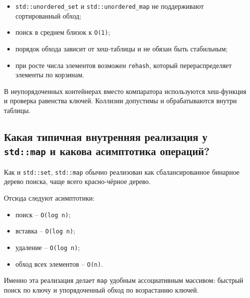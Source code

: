 \begin{itemize}
    \item \texttt{std::unordered\_set} и \texttt{std::unordered\_map} не поддерживают сортированный обход;
    \item поиск в среднем близок к \texttt{O(1)};
    \item порядок обхода зависит от хеш-таблицы и не обязан быть стабильным;
    \item при росте числа элементов возможен \texttt{rehash}, который перераспределяет элементы по корзинам.
\end{itemize}

\begin{remark}
В неупорядоченных контейнерах вместо компаратора используются хеш-функция и проверка равенства ключей. Коллизии допустимы и обрабатываются внутри таблицы.
\end{remark}

\subsection{Какая типичная внутренняя реализация у \texttt{std::map} и какова асимптотика операций?}
Как и \texttt{std::set}, \texttt{std::map} обычно реализован как сбалансированное бинарное дерево поиска, чаще всего красно-чёрное дерево.

Отсюда следуют асимптотики:
\begin{itemize}
    \item поиск -- \texttt{O(log n)};
    \item вставка -- \texttt{O(log n)};
    \item удаление -- \texttt{O(log n)};
    \item обход всех элементов -- \texttt{O(n)}.
\end{itemize}

Именно эта реализация делает \texttt{map} удобным ассоциативным массивом: быстрый поиск по ключу и упорядоченный обход по возрастанию ключей.
